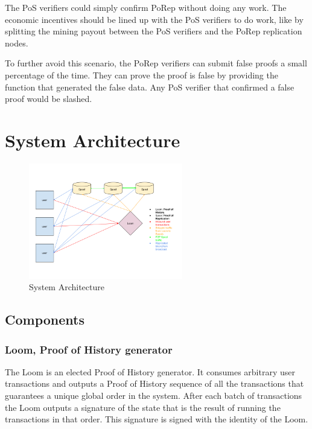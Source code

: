 \documentclass[12pt]{article}
\begin{document}
The PoS verifiers could simply confirm PoRep without doing any work. The economic incentives should be lined up with the PoS verifiers to do work, like by splitting the mining payout between the PoS verifiers and the PoRep replication nodes.

To further avoid this scenario, the PoRep verifiers can submit false proofs a small percentage of the time.  They can prove the proof is false by providing the function that generated the false data.  Any PoS verifier that confirmed a false proof would be slashed.

\section{System Architecture}\label{system_architecture}

\begin{figure}
  \begin{center}
    \centering
    \includegraphics[width=0.6\textwidth]{figures/fig_9.png}
    \caption[Fig 9]{System Architecture \label{fig_9}}
  \end{center}
  \end{figure}

\subsection{Components}

\subsubsection{Loom, Proof of History generator}
The Loom is an elected Proof of History generator. It consumes arbitrary user transactions and outputs a Proof of History sequence of all the transactions that guarantees a unique global order in the system. After each batch of transactions the Loom outputs a signature of the state that is the result of running the transactions in that order. This signature is signed with the identity of the Loom.
\end{document}
